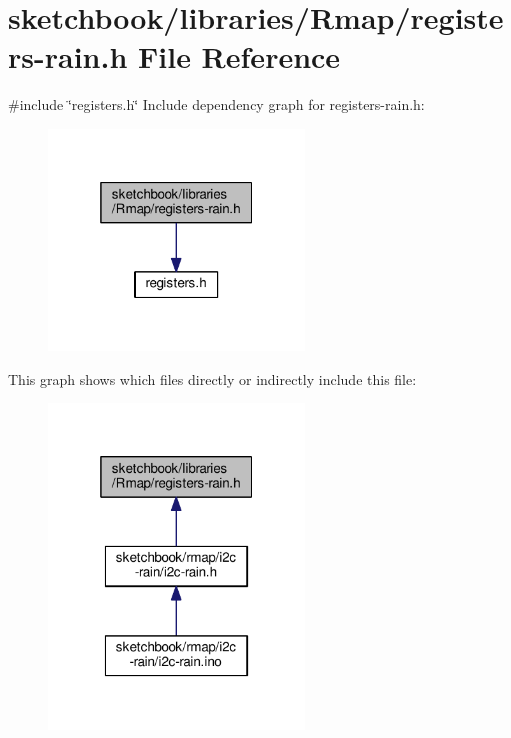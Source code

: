 \hypertarget{registers-rain_8h}{}\section{sketchbook/libraries/\+Rmap/registers-\/rain.h File Reference}
\label{registers-rain_8h}
{\ttfamily \#include \char`\"{}registers.\+h\char`\"{}}\newline
Include dependency graph for registers-\/rain.h\+:
\nopagebreak
\begin{figure}[H]
\begin{center}
\leavevmode
\includegraphics[width=193pt]{registers-rain_8h__incl}
\end{center}
\end{figure}
This graph shows which files directly or indirectly include this file\+:
\nopagebreak
\begin{figure}[H]
\begin{center}
\leavevmode
\includegraphics[width=193pt]{registers-rain_8h__dep__incl}
\end{center}
\end{figure}
